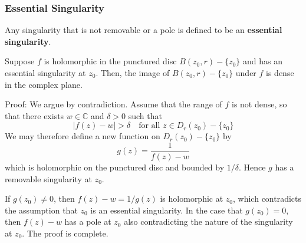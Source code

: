 \documentclass[12pt, oneside]{book}
\begin{document}
\subsubsection{Essential Singularity}

\begin{definition}
    Any singularity that is not removable or a pole is defined to be an \textbf{essential singularity}.
\end{definition}

\begin{theorem}
    Suppose $f$ is holomorphic in the punctured disc $B(z_0,r)-\{z_0\}$ and has an essential singularity at $z_0$. Then, the image of $B(z_0,r)-\{z_0\}$ under $f$ is dense in the complex plane.

    Proof: We argue by contradiction. Assume that the range of $f$ is not dense, so that there exists $w\in\mathbb{C}$ and $\delta>0$ such that
    $$|f(z)-w|>\delta\quad\text{for all }z\in D_r(z_0)-\{z_0\}$$
    We may therefore define a new function on $D_r(z_0)-\{z_0\}$ by
    $$g(z)=\frac1{f(z)-w}$$
    which is holomorphic on the punctured disc and bounded by $1/\delta$. Hence $g$ has a removable singularity at $z_0$.

    If $g(z_0)\neq0$, then $f(z)-w=1/g(z)$ is holomorphic at $z_0$, which contradicts the assumption that $z_0$ is an essential singularity. In the case that $g(z_0)=0$, then $f(z)-w$ has a pole at $z_0$ also contradicting the nature of the singularity at $z_0.$ The proof is complete.
\end{theorem}

\begin{theorem}[Picard]

\end{theorem}
\end{document}
